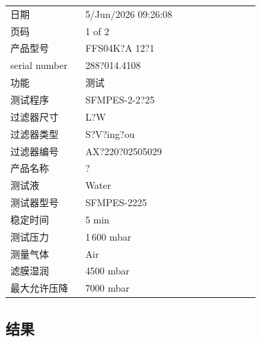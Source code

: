\documentclass[UTF8,10pt,a4paper,fontset=fandol]{ctexart}
\newcommand{\fieldvalue}[1]{#1}
\begin{document}
\begin{tabular}{@{}p{0.27\linewidth}p{0.63\linewidth}@{}}
日期 &
\fieldvalue{5/Jun/2026 09:26:08}
\\
页码 &
\fieldvalue{1 of 2}
\\
产品型号 &
\fieldvalue{FFS04K?A 12?1}
\\
serial number &
\fieldvalue{288?014.4108}
\\
功能 &
\fieldvalue{测试}
\\
测试程序 &
\fieldvalue{SFMPES-2-2?25}
\\
过滤器尺寸 &
\fieldvalue{L?W}
\\
过滤器类型 &
\fieldvalue{S?V?ing?ou}
\\
过滤器编号 &
\fieldvalue{AX?220?02505029}
\\
产品名称 &
\fieldvalue{?}
\\
测试液 &
\fieldvalue{Water}
\\
测试器型号 &
\fieldvalue{SFMPES-2225}
\\
稳定时间 &
\fieldvalue{5 min}
\\
测试压力 &
\fieldvalue{1\,600 mbar}
\\
测量气体 &
\fieldvalue{Air}
\\
滤膜湿润 &
\fieldvalue{4500 mbar}
\\
最大允许压降 &
\fieldvalue{7000 mbar}
\end{tabular}

\subsection*{结果}
\end{document}

